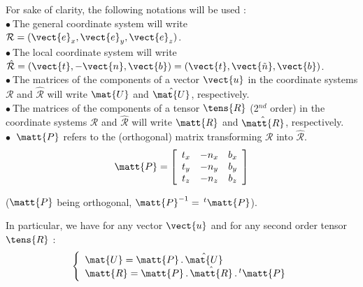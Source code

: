 For sake of clarity, the following notations will be used :\\
$\bullet\ $The general coordinate system will write
$\mathcal{R}=(\vect{e}_x,\vect{e}_y,\vect{e}_z)$.\\
$\bullet\ $The local coordinate system will write
$\hat{\mathcal{R}}=(\vect{t},-\vect{n},\vect{b})=(\vect{t},\vect{\tilde{n}},\vect{b})$.\\
$\bullet\ $The matrices of the components of a vector $\vect{u}$
in the coordinate systems
$\mathcal{R}$ and $\hat{\mathcal{R}}$ will write
$\mat{U}$ and $\hat{\mat{U}}$, respectively.\\
$\bullet\ $The matrices of the components of a tensor $\tens{R}$ (2$^{nd}$ order)
in the coordinate systems $\mathcal{R}$ and $\hat{\mathcal{R}}$ will write
 $\matt{R}$ and $\hat{\matt{R}}$, respectively.\\
$\bullet\ $ $\matt{P}$ refers to the (orthogonal) matrix transforming
 $\mathcal{R}$ into $\hat{\mathcal{R}}$.
\begin{equation}
\matt{P}=\left[
\begin{array}{ccc}
t_x & -n_x & b_x\\
t_y & -n_y & b_y\\
t_z & -n_z & b_z
\end{array}\right]
\end{equation}

($\matt{P}$ being orthogonal, $\matt{P}^{-1}=\,^t\matt{P}$).

In particular, we have for any vector $\vect{u}$
and for any second order tensor $\tens{R}$ :\\
\begin{equation}
\left\{\begin{array}{l}
\mat{U} = \matt{P}\,.\,\hat{\mat{U}}\\
\matt{R}= \matt{P}\,.\,\hat{\matt{R}}\,.\,^t\matt{P}
\end{array}\right.
\end{equation}

